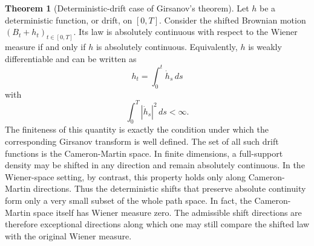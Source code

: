 \documentclass[11pt]{article}
\theoremstyle{definition}
\newtheorem{theorem}{Theorem}
\theoremstyle{remark}
\begin{document}
\begin{theorem}[Deterministic-drift case of Girsanov's theorem]
Let \(h\) be a deterministic function, or drift, on \([0,T]\). Consider the shifted Brownian motion \((B_t+h_t)_{t\in[0,T]}\). Its law is absolutely continuous with respect to the Wiener measure if and only if \(h\) is absolutely continuous. Equivalently, \(h\) is weakly differentiable and can be written as
\[
h_t=\int_0^t \dot h_s\,ds
\]
with
\[
\int_0^T |\dot h_s|^2\,ds<\infty.
\]
The finiteness of this quantity is exactly the condition under which the corresponding Girsanov transform is well defined. The set of all such drift functions is the Cameron-Martin space.
In finite dimensions, a full-support density may be shifted in any direction and remain absolutely continuous. In the Wiener-space setting, by contrast, this property holds only along Cameron-Martin directions. Thus the deterministic shifts that preserve absolute continuity form only a very small subset of the whole path space. In fact, the Cameron-Martin space itself has Wiener measure zero. The admissible shift directions are therefore exceptional directions along which one may still compare the shifted law with the original Wiener measure.
\end{theorem}
\end{document}
